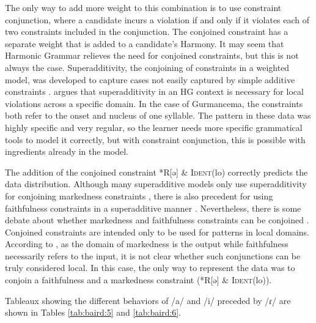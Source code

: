 \documentclass[output=paper,newtxmath,modfonts,nonflat,draftmode]{langsci/langscibook}
\begin{document}
The only way to add more weight to this combination is to use constraint conjunction, where a candidate incurs a violation if and only if it violates each of two constraints included in the conjunction. The conjoined constraint has a separate weight that is added to a candidate’s Harmony. It may seem that Harmonic Grammar relieves the need for conjoined constraints, but this is not always the case. Superadditivity, the conjoining of constraints in a weighted model, was developed to capture cases not easily captured by simple additive constraints \citep{AlbrightMagri2008,GreenDavis2014}. \citet{Smolensky2006} argues that superadditivity in an HG context is necessary for local violations across a specific domain. In the case of Gurmancema, the constraints both refer to the onset and nucleus of one syllable. The pattern in these data was highly specific and very regular, so the learner needs more specific grammatical tools to model it correctly, but with constraint conjunction, this is possible with ingredients already in the model. 

The addition of the conjoined constraint *R[ə] \& \textsc{Ident}(lo) correctly predicts the data distribution. Although many superadditive models only use superadditivity for conjoining markedness constraints \citep{AlbrightMagri2008}, there is also precedent for using faithfulness constraints in a superadditive manner \citep{GreenDavis2014}. Nevertheless, there is some debate about whether markedness and faithfulness constraints can be conjoined \citep{MoretonSmolensky2002}. Conjoined constraints are intended only to be used for patterns in local domains. According to \citet{MoretonSmolensky2002}, as the domain of markedness is the output while faithfulness necessarily refers to the input, it is not clear whether such conjunctions can be truly considered local. In this case, the only way to represent the data was to conjoin a faithfulness and a markedness constraint (*R[ə] \& \textsc{Ident}(lo)). 

Tableaux showing the different behaviors of /a/ and /i/ preceded by /ɾ/ are shown in Tables \ref{tab:baird:5} and \ref{tab:baird:6}.\largerpage[-1]
\end{document}
